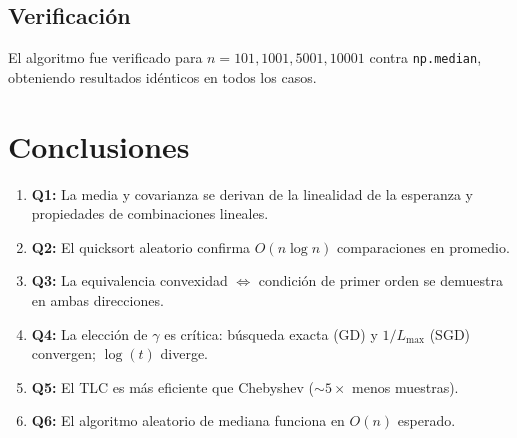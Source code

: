 \documentclass[11pt,a4paper]{article}
\begin{document}
\subsection{Verificación}
El algoritmo fue verificado para $n = 101, 1001, 5001, 10001$ contra \texttt{np.median}, obteniendo resultados idénticos en todos los casos.

\section{Conclusiones}

\begin{enumerate}
    \item \textbf{Q1:} La media y covarianza se derivan de la linealidad de la esperanza y propiedades de combinaciones lineales.
    \item \textbf{Q2:} El quicksort aleatorio confirma $O(n\log n)$ comparaciones en promedio.
    \item \textbf{Q3:} La equivalencia convexidad $\iff$ condición de primer orden se demuestra en ambas direcciones.
    \item \textbf{Q4:} La elección de $\gamma$ es crítica: búsqueda exacta (GD) y $1/L_{\max}$ (SGD) convergen; $\log(t)$ diverge.
    \item \textbf{Q5:} El TLC es más eficiente que Chebyshev ($\sim 5\times$ menos muestras).
    \item \textbf{Q6:} El algoritmo aleatorio de mediana funciona en $O(n)$ esperado.
\end{enumerate}
\end{document}
